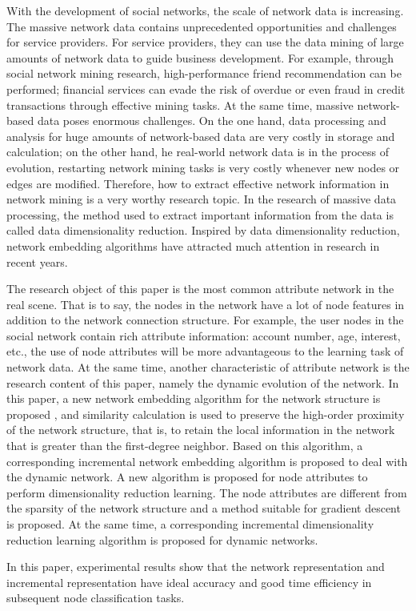 With the development of social networks, the scale of network data is increasing. The massive network data contains unprecedented opportunities and challenges for service providers. For service providers, they can use the data mining of large amounts of network data to guide business development. For example, through social network mining research, high-performance friend recommendation can be performed; financial services  can evade the risk of overdue or even fraud in credit transactions  through effective mining tasks. At the same time, massive network-based data poses enormous challenges. On the one hand, data processing and analysis for huge amounts of network-based data are very costly in storage and calculation; on the other hand, he real-world network data is in the process of evolution,  restarting network mining tasks is very costly whenever new nodes or edges are modified. Therefore, how to extract effective network information in network mining is a very worthy research topic. In the research of massive data processing, the method used to extract important information from the data is called data dimensionality reduction. Inspired by data dimensionality reduction, network embedding algorithms have attracted much attention in research in recent years.

The research object of this paper is the most common attribute network in the real scene. That is to say, the nodes in the network have a lot of node features in addition to the network connection structure. For example, the user nodes in the social network contain rich attribute information: account number, age, interest,  etc., the use of node attributes will be more advantageous to the learning task of network data. At the same time, another characteristic of attribute network is the research content of this paper, namely the dynamic evolution of the network. In this paper, a new network embedding algorithm for the network structure is proposed , and similarity calculation is used to preserve the high-order proximity of the network structure, that is, to retain the local information in the network that is greater than the first-degree neighbor. Based on this algorithm, a corresponding incremental network embedding algorithm is proposed to deal with the dynamic network. A new algorithm is proposed for node attributes to perform dimensionality reduction learning. The node attributes are different from the sparsity of the network structure and a method suitable for gradient descent is proposed.  At the same time, a corresponding incremental dimensionality reduction learning algorithm is proposed for dynamic networks.

In this paper, experimental results show that the network representation and incremental representation have ideal accuracy and good time efficiency in subsequent node classification tasks.
